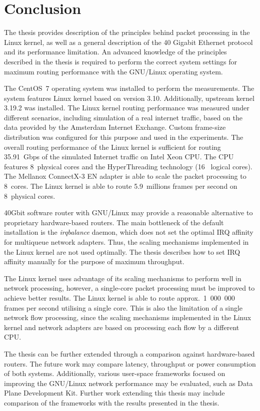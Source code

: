 
\chapter{Conclusion}\label{chap:conclusion}
The thesis provides description of the principles behind packet processing in the Linux kernel, as well as
a general description of the 40 Gigabit Ethernet protocol and its performance limitation.
An advanced knowledge of the principles described in the thesis is required to
perform the correct system settings for maximum routing performance with the GNU/Linux operating system.

The CentOS~7 operating system was installed to perform the measurements.
The system features Linux kernel based on version 3.10.
Additionally, upstream kernel 3.19.2 was installed.
The Linux kernel routing performance was measured under different scenarios, including
simulation of a real internet traffic, based on the data provided by the Amsterdam Internet Exchange.
Custom frame-size distribution was configured for this purpose and used in the experiments.
The overall routing performance of the Linux kernel is sufficient for routing 35.91~Gbps
of the simulated Internet traffic on Intel Xeon CPU.
The CPU features 8~physical cores and the HyperThreading technology (16~ logical cores).
The Mellanox ConnectX-3 EN adapter is able to scale the packet processing to 8~cores.%
The Linux kernel is able to route 5.9~millions frames per second on 8~physical cores.

40Gbit software router with GNU/Linux may provide a reasonable alternative to proprietary hardware-based routers.
The main bottleneck of the default installation is the {\it{irqbalance}} daemon, which
does not set the optimal IRQ affinity for multiqueue network adapters.
Thus, the scaling mechanisms implemented in the Linux kernel are not used optimally.
The thesis describes how to set IRQ affinity manually for the purpose of maximum throughput.

The Linux kernel uses advantage of its scaling mechanisms to perform well in network processing,
however, a single-core packet processing must be improved to achieve better results.
The Linux kernel is able to route approx.~1~000~000 %
frames per second utilising a single core.
This is also the limitation of a single network flow processing,
since the scaling mechanisms implemented in the Linux kernel and network adapters
are based on processing each flow by a different CPU.

The thesis can be further extended through a comparison against hardware-based routers.
The future work may compare latency, throughput or power consumption of both systems.
Additionally, various user-space frameworks focused on improving the GNU/Linux network performance may be evaluated,
such as Data Plane Development Kit.
Further work extending this thesis may include comparison of
the frameworks with the results presented in the thesis.
